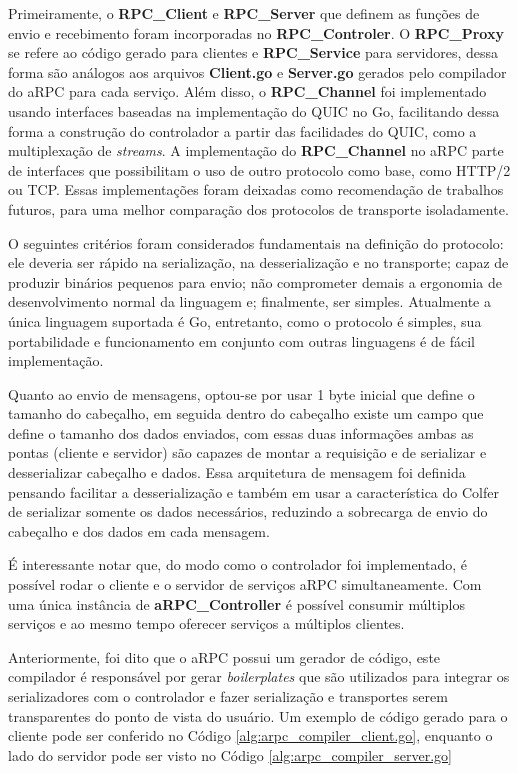 Primeiramente, o \textbf{RPC\_Client} e \textbf{RPC\_Server} que definem as funções de envio e recebimento foram incorporadas no \textbf{RPC\_Controler}. O \textbf{RPC\_Proxy} se refere ao código gerado para clientes e \textbf{RPC\_Service} para servidores, dessa forma são análogos aos arquivos \textbf{Client.go} e \textbf{Server.go} gerados pelo compilador do aRPC para cada serviço. Além disso, o \textbf{RPC\_Channel} foi implementado usando interfaces baseadas na implementação do QUIC no Go, facilitando dessa forma a construção do controlador a partir das facilidades do QUIC, como a multiplexação de \textit{streams}. A implementação do \textbf{RPC\_Channel} no aRPC parte de interfaces que possibilitam o uso de outro protocolo como base, como HTTP/2 ou TCP. Essas implementações foram deixadas como recomendação de trabalhos futuros, para uma melhor comparação dos protocolos de transporte isoladamente.

O seguintes critérios foram considerados fundamentais na definição do protocolo: ele deveria ser rápido na serialização, na desserialização e no transporte; capaz de produzir binários pequenos para envio; não comprometer demais a ergonomia de desenvolvimento normal da linguagem e; finalmente, ser simples. Atualmente a única linguagem suportada é Go, entretanto, como o protocolo é simples, sua portabilidade e funcionamento em conjunto com outras linguagens é de fácil implementação.

Quanto ao envio de mensagens, optou-se por usar 1 byte inicial que define o tamanho do cabeçalho, em seguida dentro do cabeçalho existe um campo que define o tamanho dos dados enviados, com essas duas informações ambas as pontas (cliente e servidor) são capazes de montar a requisição e de serializar e desserializar cabeçalho e dados. Essa arquitetura de mensagem foi definida pensando facilitar a desserialização e também em usar a característica do Colfer de serializar somente os dados necessários, reduzindo a sobrecarga de envio do cabeçalho e dos dados em cada mensagem.

É interessante notar que, do modo como o controlador foi implementado, é possível rodar o cliente e o servidor de serviços aRPC simultaneamente. Com uma única instância de \textbf{aRPC\_Controller} é possível consumir múltiplos serviços e ao mesmo tempo oferecer serviços a múltiplos clientes. 

Anteriormente, foi dito que o aRPC possui um gerador de código, este compilador é responsável por gerar \textit{boilerplates} que são utilizados para integrar os serializadores com o controlador e fazer serialização e transportes serem transparentes do ponto de vista do usuário. Um exemplo de código gerado para o cliente pode ser conferido no Código \ref{alg:arpc_compiler_client.go}, enquanto o lado do servidor pode ser visto no Código \ref{alg:arpc_compiler_server.go}

